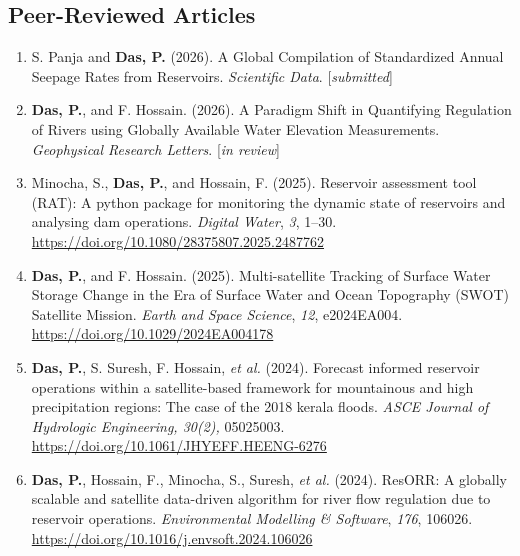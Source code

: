 \documentclass[a4paper,9pt]{extarticle}
\begin{document}
    \subsection*{Peer-Reviewed Articles}
    \begin{enumerate}
    

        \item S. Panja and \textbf{Das, P.} (2026). A Global Compilation of Standardized Annual Seepage Rates from Reservoirs. \textit{Scientific Data}. [\textit{submitted}]
    
        \item \textbf{Das, P.}, and F. Hossain. (2026). A Paradigm Shift in Quantifying Regulation of Rivers using Globally Available Water Elevation Measurements. \textit{Geophysical Research Letters}. [\textit{in review}]

        \item Minocha, S., \textbf{Das, P.}, and Hossain, F. (2025). Reservoir assessment tool (RAT): A python package for monitoring the dynamic state of reservoirs and analysing dam operations. \textit{Digital Water}, \textit{3}, 1--30. \href{https://doi.org/10.1080/28375807.2025.2487762}{https://doi.org/10.1080/28375807.2025.2487762}

        \item \textbf{Das, P.}, and F. Hossain. (2025). Multi-satellite Tracking of Surface Water Storage Change in the Era of Surface Water and Ocean Topography (SWOT) Satellite Mission. \textit{Earth and Space Science}, \textit{12}, e2024EA004. \href{https://doi.org/10.1029/2024EA004178}{https://doi.org/10.1029/2024EA004178}

        \item \textbf{Das, P.}, S. Suresh, F. Hossain, \textit{et al.} (2024). Forecast informed reservoir operations within a satellite-based framework for mountainous and high precipitation regions: The case of the 2018 kerala floods. \textit{ASCE Journal of Hydrologic Engineering, 30(2),} 05025003. \href{https://doi.org/10.1061/JHYEFF.HEENG-6276}{https://doi.org/10.1061/JHYEFF.HEENG-6276}

        \item \textbf{Das, P.}, Hossain, F., Minocha, S., Suresh, \textit{et al.} (2024). ResORR: A globally scalable and satellite data-driven algorithm for river flow regulation due to reservoir operations. \textit{Environmental Modelling \& Software}, \textit{176}, 106026. \href{https://doi.org/10.1016/j.envsoft.2024.106026}{https://doi.org/10.1016/j.envsoft.2024.106026}


\end{enumerate}
\end{document}
